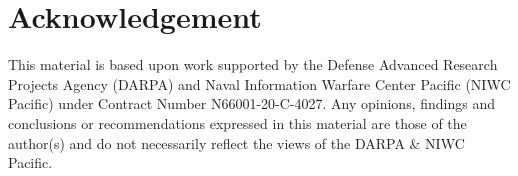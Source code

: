 \section{Acknowledgement}

This material is based upon work supported by the Defense Advanced Research Projects Agency (DARPA) and Naval Information Warfare Center Pacific (NIWC Pacific) under Contract Number N66001-20-C-4027. Any opinions, findings and conclusions or recommendations expressed in this material are those of the author(s) and do not necessarily reflect the views of the DARPA \& NIWC Pacific.

